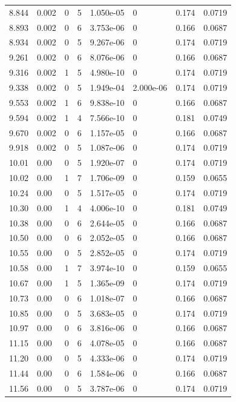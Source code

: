 \documentclass[preview]{standalone}
\begin{document}
{{{\begin{tabular}{L{1.2cm}C{1.2cm} C{0.3cm}C{0.5cm} C{1.4cm}C{1.4cm} C{1.4cm}C{1.4cm}}
  8.844  &  0.002  & 0     &  5 &  1.050e-05  & 0  & 0.174 &  0.0719   \\ 
  8.893  &  0.002  & 0     &  6 &  3.753e-06  & 0  & 0.166 &  0.0687   \\ 
  8.934  &  0.002  & 0     &  5 &  9.267e-06  & 0  & 0.174 &  0.0719   \\ 
  9.261  &  0.002  & 0     &  6 &  8.076e-06  & 0  & 0.166 &  0.0687   \\ 
  9.316  &  0.002  & 1     &  5 &  4.980e-10  & 0  & 0.174 &  0.0719   \\ 
  9.338  &  0.002  & 0     &  5 &  1.949e-04  & 2.000e-06  & 0.174 &  0.0719   \\ 
  9.553  &  0.002  & 1     &  6 &  9.838e-10  & 0  & 0.166 &  0.0687   \\ 
  9.594  &  0.002  & 1     &  4 &  7.566e-10  & 0  & 0.181 &  0.0749   \\ 
  9.670  &  0.002  & 0     &  6 &  1.157e-05  & 0  & 0.166 &  0.0687   \\ 
  9.918  &  0.002  & 0     &  5 &  1.087e-06  & 0  & 0.174 &  0.0719   \\ 
  10.01  &  0.00  & 0     &  5 &  1.920e-07  & 0  & 0.174 &  0.0719   \\ 
  10.02  &  0.00  & 1     &  7 &  1.706e-09  & 0  & 0.159 &  0.0655   \\ 
  10.24  &  0.00  & 0     &  5 &  1.517e-05  & 0  & 0.174 &  0.0719   \\ 
  10.30  &  0.00  & 1     &  4 &  4.006e-10  & 0  & 0.181 &  0.0749   \\ 
  10.38  &  0.00  & 0     &  6 &  2.644e-05  & 0  & 0.166 &  0.0687   \\ 
  10.50  &  0.00  & 0     &  6 &  2.052e-05  & 0  & 0.166 &  0.0687   \\ 
  10.55  &  0.00  & 0     &  5 &  2.852e-05  & 0  & 0.174 &  0.0719   \\ 
  10.58  &  0.00  & 1     &  7 &  3.974e-10  & 0  & 0.159 &  0.0655   \\ 
  10.67  &  0.00  & 1     &  5 &  1.365e-09  & 0  & 0.174 &  0.0719   \\ 
  10.73  &  0.00  & 0     &  6 &  1.018e-07  & 0  & 0.166 &  0.0687   \\ 
  10.85  &  0.00  & 0     &  5 &  3.683e-05  & 0  & 0.174 &  0.0719   \\ 
  10.97  &  0.00  & 0     &  6 &  3.816e-06  & 0  & 0.166 &  0.0687   \\ 
  11.15  &  0.00  & 0     &  6 &  4.078e-05  & 0  & 0.166 &  0.0687   \\ 
  11.20  &  0.00  & 0     &  5 &  4.333e-06  & 0  & 0.174 &  0.0719   \\ 
  11.44  &  0.00  & 0     &  6 &  1.584e-06  & 0  & 0.166 &  0.0687   \\ 
  11.56  &  0.00  & 0     &  5 &  3.787e-06  & 0  & 0.174 &  0.0719   \\ 
\hline 
\end{tabular} 

}}}
\end{document}
